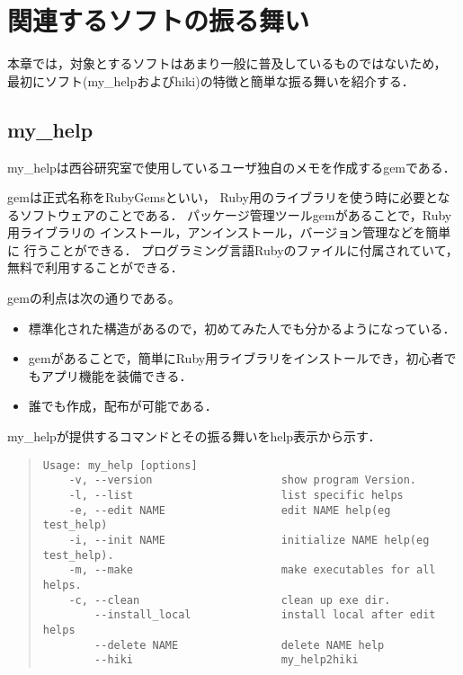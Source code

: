\section{関連するソフトの振る舞い}
本章では，対象とするソフトはあまり一般に普及しているものではないため，
最初にソフト(my\_helpおよびhiki)の特徴と簡単な振る舞いを紹介する．

\subsection{my\_help}
my\_helpは西谷研究室で使用しているユーザ独自のメモを作成するgemである．

gemは正式名称をRubyGemsといい，
Ruby用のライブラリを使う時に必要となるソフトウェアのことである\cite{c}．
パッケージ管理ツールgemがあることで，Ruby用ライブラリの
インストール，アンインストール，バージョン管理などを簡単に
行うことができる．
プログラミング言語Rubyのファイルに付属されていて，
無料で利用することができる．

gemの利点は次の通りである。
\begin{itemize}
\item 標準化された構造があるので，初めてみた人でも分かるようになっている．
\item gemがあることで，簡単にRuby用ライブラリをインストールでき，初心者でもアプリ機能を装備できる．
\item 誰でも作成，配布が可能である．
\end{itemize}

my\_helpが提供するコマンドとその振る舞いをhelp表示から示す．
\begin{quote}\begin{verbatim}
Usage: my_help [options]
    -v, --version                    show program Version.
    -l, --list                       list specific helps
    -e, --edit NAME                  edit NAME help(eg test_help)
    -i, --init NAME                  initialize NAME help(eg test_help).
    -m, --make                       make executables for all helps.
    -c, --clean                      clean up exe dir.
        --install_local              install local after edit helps
        --delete NAME                delete NAME help
        --hiki                       my_help2hiki
\end{verbatim}\end{quote}

